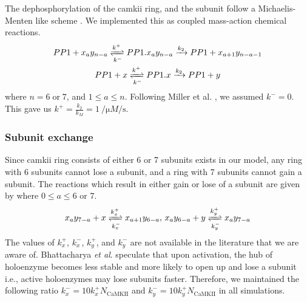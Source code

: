 \documentclass[9pt,lineno,doublespacing]{elife}
\begin{document}
{The dephosphorylation of the \gls{camkii} ring, and the subunit follow a
Michaelis-Menten like scheme . We implemented this 
as coupled mass-action chemical reactions.
\begin{equation}\label{eq:dephosphorylation}
    \begin{gathered}
        PP1 + x_ay_{n-a} \xrightleftharpoons[k^-]{k^+} PP1.x_ay_{n-a} 
            \xrightarrow{k_2} PP1 + x_{a+1}y_{n-a-1} \\
        PP1 + x \xrightleftharpoons[k^-]{k^+} PP1.x \xrightarrow{k_2} PP1 + y
    \end{gathered}
\end{equation} where $n=6\;\text{or}\;7$, and $1\le a \le n$. Following Miller
et al. \citep{miller_stability_2005}, we assumed $k^-=0$. This gave us
$k^+=\frac{k_2}{k_M}=\SI{1}{\per\micro M\per\second}$.

\subsubsection{Subunit exchange}\label{subunit exchange}
Since \gls{camkii} ring consists of either 6 or 7 subunits exists in our model,
any ring with 6 subunits cannot lose a subunit, and a ring with 7 subunits cannot
gain a subunit. The reactions which result in either gain or lose of a
subunit are given by  where $0\le a \le 6\text{ or }7$.
\begin{equation}\label{eq:losegainx}
    \begin{gathered}
    x_ay_{7-a} + x \xrightleftharpoons[k^-_x]{k^+_x} x_{a+1}y_{6-a},\,
    x_ay_{6-a} + y \xrightleftharpoons[k^-_y]{k^+_y} x_{a}y_{7-a}
    \end{gathered}
\end{equation}
The values of $k_x^+$, $k_x^-$, $k_y^+$, and $k_y^-$ are not available in the
literature that we are aware of. Bhattacharya \textit{et al}. 
\citep{bhattacharyya_molecular_2016} speculate that upon activation, the hub
of holoenzyme becomes less stable and more likely to open up and lose a subunit
i.e., active holoenzymes may lose subunits faster. Therefore, we maintained the
following ratio \(k_x^- = 10 k_x^+ N_{\text{CaMKII}}\) and \(k_y^- = 10 k_y^+
N_{\text{CaMKII}}\) in all simulations.

}
\end{document}
